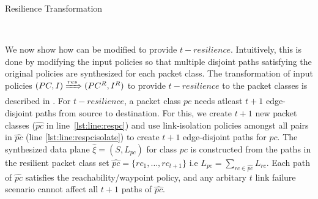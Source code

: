 \begin{algorithm}[h]
	\begin{footnotesize}
		\caption{Resilience Transformation}
		\label{restransform}
		\begin{algorithmic}[1]
			\vspace*{0.25cm}
			 \label{lst:line:respc}
			  \label{lst:line:respcisolate}
			 \label{lst:line:respcend}
			\EndFor
			 \label{lst:line:respolicy}
			\EndFor \\
		\end{algorithmic}
	\end{footnotesize}
\end{algorithm}

 We now show how \Name can be modified to provide $t-resilience$.
Intuitively, this  is done by modifying the input policies so that  multiple disjoint paths satisfying the original
policies are synthesized for each packet class.
\noindent The transformation of input policies $(PC, I) \xRightarrow{res} (PC^R, I^R)$
to provide $t-resilience$ to the packet classes is described in . 
For $t-resilience$, a packet class $pc$ needs atleast $t+1$ edge-disjoint paths from
source to destination. For this, we create $t+1$ new packet classes ($\hat{pc}$ in line~\ref{lst:line:respc})
and use link-isolation policies amongst all pairs in $\hat{pc}$ (line \ref{lst:line:respcisolate})
to create $t+1$ edge-disjoint paths for $pc$.
The synthesized data plane $\hat{\xi} = (S, L_{pc})$ for class $pc$ is constructed from the 
paths in the resilient packet class set $\hat{pc} = \{rc_1,\ldots,rc_{t+1}\}$
i.e $L_{pc} = \sum\limits_{rc \in \hat{pc}} L_{rc}$.  
Each path of $\hat{pc}$ satisfies the reachability/waypoint policy, 
and any arbitary $t$ link failure scenario cannot affect all $t+1$ paths of $\hat{pc}$.


